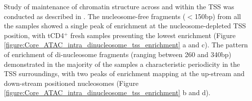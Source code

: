 Study of maintenance of chromatin structure across and within the TSS was conducted as described in \parencite{Scharer2016}. The nucleosome-free fragments ($<$150bp) from all the samples showed a single peak of enrichment at the nucleosome-depleted TSS position, with tCD4$^+$ fresh samples presenting the lowest enrichment (Figure \ref{figure:Core_ATAC_intra_dinucleosome_tss_enrichment} a and c). The pattern of enrichment of di-nucleosome fragments (ranging between 260 and 340bp) demonstrated in the majority of the samples a characteristic periodicity in the TSS surroundings, with two peaks of enrichment mapping at the up-stream and down-stream positioned nucleosomes (Figure \ref{figure:Core_ATAC_intra_dinucleosome_tss_enrichment} b and d). 




